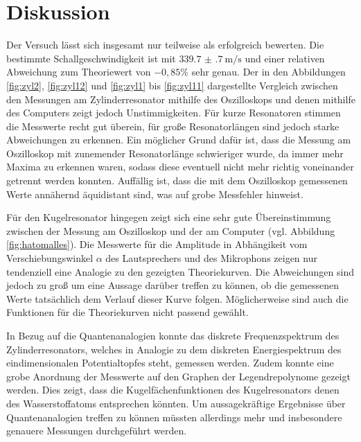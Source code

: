 \section{Diskussion}
\label{sec:Diskussion}

Der Versuch lässt sich insgesamt nur teilweise als erfolgreich bewerten. Die bestimmte
Schallgeschwindigkeit ist mit $\SI{339.7(7)}{\meter\per\second}$ und einer relativen Abweichung zum Theoriewert
von $-0{,}85\%$ sehr genau.
Der in den Abbildungen \ref{fig:zyl2}, \ref{fig:zyl12} und \ref{fig:zyl1} bis \ref{fig:zyl11}
dargestellte Vergleich zwischen den Messungen am Zylinderresonator mithilfe des Oszilloskops und denen mithilfe des
Computers zeigt jedoch Unstimmigkeiten. Für kurze Resonatoren stimmen die Messwerte recht
gut überein, für große Resonatorlängen sind jedoch starke Abweichungen zu erkennen. Ein möglicher
Grund dafür ist, dass die Messung am Oszilloskop mit zunemender Resonatorlänge schwieriger wurde,
da immer mehr Maxima zu erkennen waren, sodass diese eventuell nicht mehr richtig voneinander getrennt
werden konnten. Auffällig ist, dass die mit dem Oszilloskop gemessenen Werte annähernd
äquidistant sind, was auf grobe Messfehler hinweist.

Für den Kugelresonator hingegen zeigt sich eine sehr gute Übereinstimmung zwischen der Messung
am Oszilloskop und der am Computer (vgl. Abbildung \ref{fig:hatomalles}). Die Messwerte für die
Amplitude in Abhängikeit vom Verschiebungswinkel $\alpha$ des Lautsprechers und des Mikrophons
zeigen nur tendenziell eine Analogie zu den gezeigten Theoriekurven. Die Abweichungen sind
jedoch zu groß um eine Aussage darüber treffen zu können, ob die gemessenen Werte
tatsächlich dem Verlauf dieser Kurve folgen. Möglicherweise sind auch die Funktionen
für die Theoriekurven nicht passend gewählt.

In Bezug auf die Quantenanalogien konnte das diskrete Frequenzspektrum des Zylinderresonators, welches in Analogie zu dem diskreten Energiespektrum des eindimensionalen Potentialtopfes steht, gemessen werden. Zudem konnte
eine grobe Anordnung der Messwerte auf den Graphen der Legendrepolynome gezeigt werden. Dies zeigt, dass die Kugelfächenfunktionen des Kugelresonators denen des
Wasserstoffatoms entsprechen könnten. Um aussagekräftige Ergebnisse über Quantenanalogien treffen zu können müssten allerdings mehr und insbesondere genauere Messungen durchgeführt werden.
